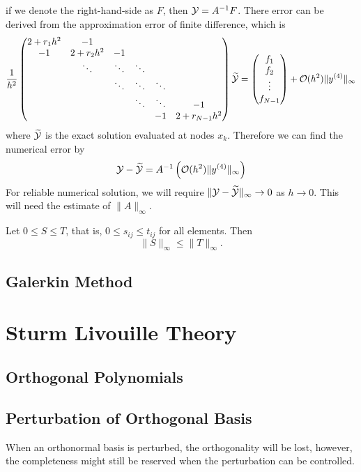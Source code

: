 if we denote the right-hand-side as $F$, then $\mathcal Y = A^{-1} F$. There error can be derived from the approximation error of finite difference, which is 
\begin{equation}
    \frac{1}{h^2}\begin{pmatrix}
        2 + r_1h^2 & - 1 &&&&\\
        -1 & 2 + r_2 h^2 & -1 &&&\\
        &\ddots &\ddots & \ddots && \\ 
        & &\ddots &\ddots & \ddots & \\ 
        & &&\ddots & \ddots & -1 \\
        &&&& -1 & 2 + r_{N-1} h^2  
    \end{pmatrix} \widetilde{ \mathcal Y} = \begin{pmatrix}
        f_1\\f_2\\\vdots \\ f_{N-1}
    \end{pmatrix}  + \mathcal O(h^2)\|y^{(4)}\|_{\infty}
\end{equation}
where $\widetilde{\mathcal Y}$ is the exact solution evaluated at nodes $x_k$. Therefore we can find the numerical error by 
\begin{equation}
    \mathcal Y - \widetilde{\mathcal Y} = A^{-1} \left(   \mathcal O(h^2) \|y^{(4)}\|_{\infty} \right)
\end{equation}
For reliable numerical solution, we will require $\|\mathcal Y - \widetilde{\mathcal Y}\|_{\infty}\to 0$ as $h\to 0$. This will need the estimate of $\|A\|_{\infty}$.
\begin{lemma}
    Let $0\le S \le T$, that is, $0\le s_{ij}\le t_{ij}$ for all elements. Then $$\|S\|_{\infty}\le \|T\|_{\infty}.$$
\end{lemma}





\subsection{Galerkin Method}

\section{Sturm Livouille Theory}
\subsection{Orthogonal Polynomials}
\label{SSec: 5-Ort-Pol}
\subsection{Perturbation of Orthogonal Basis}
When an orthonormal basis is perturbed, the orthogonality will be lost, however, the completeness might still be reserved when the perturbation can be controlled. 
\begin{definition}
    
\end{definition}
